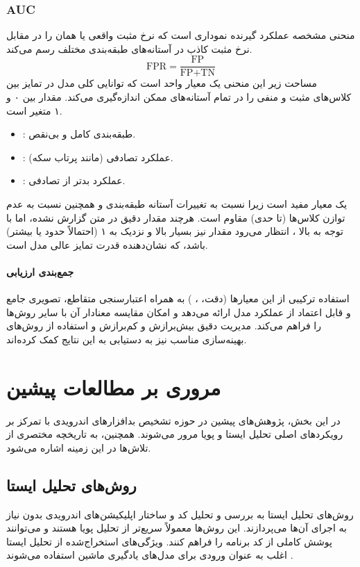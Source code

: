 \subsubsection{AUC }
منحنی مشخصه عملکرد گیرنده  نموداری است که نرخ مثبت واقعی  یا همان  را در مقابل نرخ مثبت کاذب  در آستانه‌های طبقه‌بندی مختلف رسم می‌کند.
\[ \text{FPR} = \frac{\text{FP}}{\text{FP} + \text{TN}} \]
مساحت زیر این منحنی  یک معیار واحد است که توانایی کلی مدل در تمایز بین کلاس‌های مثبت و منفی را در تمام آستانه‌های ممکن اندازه‌گیری می‌کند. مقدار  بین ۰ و ۱ متغیر است.
\begin{itemize}
    \item {}: طبقه‌بندی کامل و بی‌نقص.
    \item {}: عملکرد تصادفی (مانند پرتاب سکه).
    \item {}: عملکرد بدتر از تصادفی.
\end{itemize}
 یک معیار مفید است زیرا نسبت به تغییرات آستانه طبقه‌بندی و همچنین نسبت به عدم توازن کلاس‌ها (تا حدی) مقاوم است. هرچند مقدار دقیق  در متن گزارش نشده، اما با توجه به  بالا ، انتظار می‌رود مقدار  نیز بسیار بالا و نزدیک به ۱ (احتمالاً حدود  یا بیشتر) باشد، که نشان‌دهنده قدرت تمایز عالی مدل  است.

\paragraph{جمع‌بندی ارزیابی}
استفاده ترکیبی از این معیارها (دقت، ، ) به همراه اعتبارسنجی متقاطع، تصویری جامع و قابل اعتماد از عملکرد مدل  ارائه می‌دهد و امکان مقایسه معنادار آن با سایر روش‌ها را فراهم می‌کند. مدیریت دقیق بیش‌برازش و کم‌برازش و استفاده از روش‌های بهینه‌سازی مناسب نیز به دستیابی به این نتایج کمک کرده‌اند.

\section{مروری بر مطالعات پیشین}
در این بخش، پژوهش‌های پیشین در حوزه تشخیص بدافزارهای اندرویدی با تمرکز بر رویکردهای اصلی تحلیل ایستا و پویا مرور می‌شوند. همچنین، به تاریخچه مختصری از تلاش‌ها در این زمینه اشاره می‌شود.

\subsection{روش‌های تحلیل ایستا}
روش‌های تحلیل ایستا  به بررسی و تحلیل کد و ساختار اپلیکیشن‌های اندرویدی بدون نیاز به اجرای آن‌ها می‌پردازند. این روش‌ها معمولاً سریع‌تر از تحلیل پویا هستند و می‌توانند پوشش کاملی از کد برنامه را فراهم کنند. ویژگی‌های استخراج‌شده از تحلیل ایستا اغلب به عنوان ورودی برای مدل‌های یادگیری ماشین استفاده می‌شوند \cite{AndroidMalwareSurvey}.


